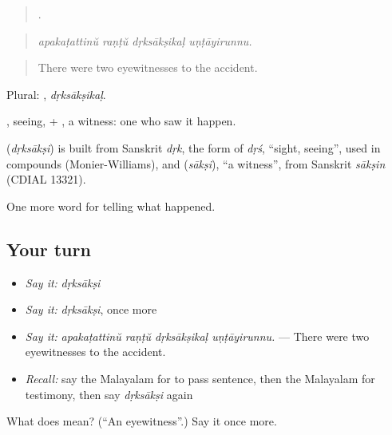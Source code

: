 \begin{quote}
   .
\end{quote}

\begin{quote}
\emph{apakaṭattinŭ raṇṭŭ dṛksākṣikaḷ uṇṭāyirunnu.}
\end{quote}

\begin{quote}
There were two eyewitnesses to the accident.
\end{quote}

Plural: , \emph{dṛksākṣikaḷ}.

, seeing, + , a witness: one who saw it happen.

\begin{cousinweb}
\textbf{} (\emph{dṛksākṣi}) is built from Sanskrit \emph{dṛk}, the form of \emph{dṛś}, \textquotedblleft{}sight, seeing\textquotedblright{}, used in compounds (Monier-Williams), and  (\emph{sākṣi}), \textquotedblleft{}a witness\textquotedblright{}, from Sanskrit \emph{sākṣin} (CDIAL 13321).
\end{cousinweb}

\begin{grammarlens}[title={What you've built}]
One more word for telling what happened.
\end{grammarlens}

\subsection*{Your turn}
\begin{itemize}
\raggedright
  \item \emph{Say it:} \emph{dṛksākṣi}
  \item \emph{Say it:} \emph{dṛksākṣi}, once more
  \item \emph{Say it:} \emph{apakaṭattinŭ raṇṭŭ dṛksākṣikaḷ uṇṭāyirunnu.} — There were two eyewitnesses to the accident.
  \item \emph{Recall:} say the Malayalam for to pass sentence, then the Malayalam for testimony, then say \emph{dṛksākṣi} again
\end{itemize}

\begin{tcolorbox}[breakable,colback=teal!4,colframe=teal!35!black,title={Before you move on}]
What does  mean? (\textquotedblleft{}An eyewitness\textquotedblright{}.) Say it once more.
\end{tcolorbox}
